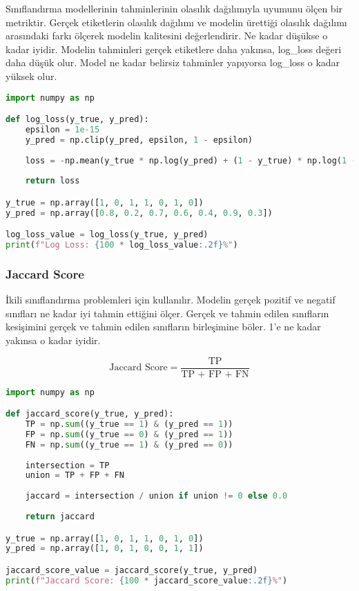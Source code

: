 Sınıflandırma modellerinin tahminlerinin olasılık dağılımıyla uyumunu ölçen bir metriktir. Gerçek etiketlerin olasılık dağılımı ve modelin ürettiği olasılık dağılımı arasındaki farkı ölçerek modelin kalitesini değerlendirir. Ne kadar düşükse o kadar iyidir. Modelin tahminleri gerçek etiketlere daha yakınsa, log\_loss değeri daha düşük olur. Model ne kadar belirsiz tahminler yapıyorsa log\_loss o kadar yüksek olur.

\begin{lstlisting}[language=Python]
import numpy as np

def log_loss(y_true, y_pred):
    epsilon = 1e-15
    y_pred = np.clip(y_pred, epsilon, 1 - epsilon)
    
    loss = -np.mean(y_true * np.log(y_pred) + (1 - y_true) * np.log(1 - y_pred))
    
    return loss

y_true = np.array([1, 0, 1, 1, 0, 1, 0])
y_pred = np.array([0.8, 0.2, 0.7, 0.6, 0.4, 0.9, 0.3])

log_loss_value = log_loss(y_true, y_pred)
print(f"Log Loss: {100 * log_loss_value:.2f}%")
\end{lstlisting}

\newpage

\subsubsection{Jaccard Score}

İkili sınıflandırma problemleri için kullanılır. Modelin gerçek pozitif ve negatif sınıfları ne kadar iyi tahmin ettiğini ölçer. Gerçek ve tahmin edilen sınıfların kesişimini gerçek ve tahmin edilen sınıfların birleşimine böler. 1'e ne kadar yakınsa o kadar iyidir.

\[\text{Jaccard Score} = \frac{\text{TP}}{\text{TP + FP + FN}}\]

\begin{lstlisting}[language=Python]
import numpy as np

def jaccard_score(y_true, y_pred):
    TP = np.sum((y_true == 1) & (y_pred == 1))
    FP = np.sum((y_true == 0) & (y_pred == 1))
    FN = np.sum((y_true == 1) & (y_pred == 0))
    
    intersection = TP
    union = TP + FP + FN
    
    jaccard = intersection / union if union != 0 else 0.0
    
    return jaccard

y_true = np.array([1, 0, 1, 1, 0, 1, 0])
y_pred = np.array([1, 0, 1, 0, 0, 1, 1])

jaccard_score_value = jaccard_score(y_true, y_pred)
print(f"Jaccard Score: {100 * jaccard_score_value:.2f}%")
\end{lstlisting}

